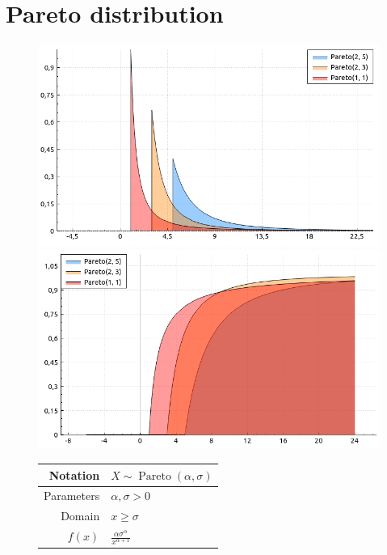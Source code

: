 \documentclass[a4paper,11pt]{article}
\theoremstyle{plain}
\theoremstyle{definition}
\begin{document}
\section{Pareto distribution}
\begin{figure}[!htb]\centering
	\begin{minipage}{0.55\textwidth}
		\includegraphics[width=\linewidth, right]{pareto_pdf}
		\captionsetup{labelformat=empty}
		\includegraphics[width=\linewidth, right]{pareto_cdf}
		\captionsetup{labelformat=empty}
	\end{minipage}
	\begin{minipage}{0.4\textwidth}
		\begin{tabular}{| r | l |}
			\hline
			Notation & $X \sim \operatorname{Pareto}(\alpha, \sigma)$ \\
			\hline
			Parameters & $\alpha,  \sigma > 0 $ \\
			\hline
			Domain & $x \geq \sigma$  \\
			\hline
			$f(x)$ & $ \frac{\alpha \sigma^\alpha}{x^{\alpha+1}}  $ \\

\end{tabular}
\end{minipage}
\end{figure}
\end{document}
